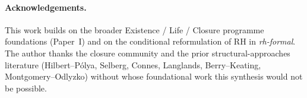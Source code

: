 \documentclass[11pt,a4paper]{article}
\theoremstyle{definition}
\theoremstyle{remark}
\begin{document}
\paragraph{Acknowledgements.}
This work builds on the broader Existence / Life / Closure programme
foundations (Paper~I) and on the conditional reformulation of RH in
\emph{rh-formal}. The author thanks the closure community and the
prior structural-approaches literature (Hilbert--P\'olya, Selberg,
Connes, Langlands, Berry--Keating, Montgomery--Odlyzko) without whose
foundational work this synthesis would not be possible.



\end{document}
